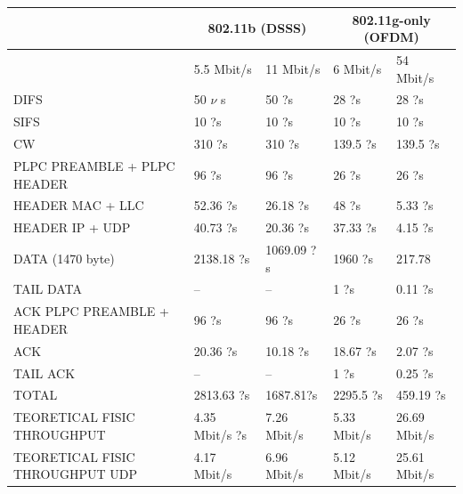 	\begin{table}[h!]
		\begin{tabularx}{15cm}{ | X | X | X | X | X | }
			\hline
				 & \multicolumn{2}{|c|}{ 802.11b (DSSS)} & \multicolumn{2}{|c|}{ 802.11g-only (OFDM)} \\
				 \hline
				 & 5.5 Mbit/s & 11 Mbit/s & 6 Mbit/s & 54 Mbit/s \\
			\hline
				DIFS & 50 $\nu$ s & 50 ?s & 28 ?s & 28 ?s \\
			\hline
				SIFS & 10 ?s & 10 ?s & 10 ?s & 10 ?s \\
			\hline
				CW & 310 ?s & 310 ?s & 139.5 ?s & 139.5 ?s \\
			\hline
				PLPC PREAMBLE + PLPC HEADER & 96 ?s & 96 ?s & 26 ?s & 26 ?s \\
			\hline
				HEADER MAC + LLC & 52.36 ?s & 26.18 ?s & 48 ?s & 5.33 ?s \\
			\hline
				HEADER IP + UDP & 40.73 ?s & 20.36 ?s & 37.33 ?s & 4.15 ?s \\
			\hline
				DATA (1470 byte)& 2138.18 ?s & 1069.09 ?s & 1960 ?s & 217.78 \\
			\hline
				TAIL DATA & -- & -- & 1 ?s & 0.11 ?s \\
			\hline
				ACK PLPC PREAMBLE + HEADER & 96 ?s & 96 ?s & 26 ?s & 26 ?s \\
			\hline
				ACK & 20.36 ?s & 10.18 ?s & 18.67 ?s & 2.07 ?s \\
			\hline
				TAIL ACK & -- & -- & 1 ?s & 0.25 ?s \\
			\hline
			\hline
				TOTAL & 2813.63 ?s & 1687.81?s & 2295.5 ?s & 459.19 ?s \\
			\hline
			\hline
				TEORETICAL FISIC THROUGHPUT & 4.35 Mbit/s ?s & 7.26 Mbit/s & 5.33 Mbit/s & 26.69 Mbit/s \\
			\hline
			\hline
				TEORETICAL FISIC THROUGHPUT UDP & 4.17 Mbit/s & 6.96 Mbit/s & 5.12 Mbit/s & 25.61 Mbit/s \\
			\hline
			
		\end{tabularx}
	\end{table}
	
	

	








